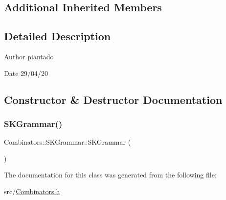 \subsection*{Additional Inherited Members}


\subsection{Detailed Description}
\begin{DoxyAuthor}{Author}
piantado 
\end{DoxyAuthor}
\begin{DoxyDate}{Date}
29/04/20 
\end{DoxyDate}


\subsection{Constructor \& Destructor Documentation}
\mbox{\label{class_combinators_1_1_s_k_grammar_a6bdc75326a1d81758bb23036de2819f0}} 
\subsubsection{\texorpdfstring{S\+K\+Grammar()}{SKGrammar()}}
{\footnotesize\ttfamily Combinators\+::\+S\+K\+Grammar\+::\+S\+K\+Grammar (\begin{DoxyParamCaption}{ }\end{DoxyParamCaption})\hspace{0.3cm}{\ttfamily [inline]}}



The documentation for this class was generated from the following file\+:\begin{DoxyCompactItemize}
\item 
src/\hyperlink{_combinators_8h}{Combinators.\+h}\end{DoxyCompactItemize}
